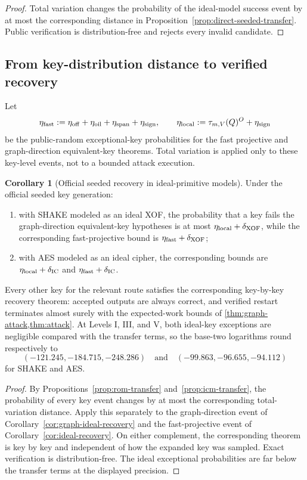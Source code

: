 \documentclass[11pt,a4paper]{article}
\theoremstyle{definition}
\newtheorem{corollary}[theorem]{Corollary}
\theoremstyle{remark}
\newcommand{\oil}{\mathrm{oil}}
\newcommand{\off}{\mathrm{off}}
\begin{document}
\begin{proof}
Total variation changes the probability of the ideal-model success event by at
most the corresponding distance in Proposition~\ref{prop:direct-seeded-transfer}.  Public
verification is distribution-free and rejects every invalid candidate.
\end{proof}

\subsection{From key-distribution distance to verified recovery}

Let
\[
 \eta_{\rm fast}:=\eta_{\off}+\eta_{\oil}+\eta_{\rm span}+\eta_{\rm sign},
 \qquad
 \eta_{\rm local}:=\tau_{m,V}(Q)^O+\eta_{\rm sign}
\]
be the public-random exceptional-key probabilities for the fast projective and graph-direction equivalent-key theorems.  Total variation is applied only to these key-level events, not to a bounded attack execution.

\begin{corollary}[Official seeded recovery in ideal-primitive models]\label{cor:seeded-ideal-primitives}
Under the official seeded key generation:
\begin{enumerate}
\item with SHAKE modeled as an ideal XOF, the probability that a key fails the graph-direction equivalent-key hypotheses is at most $\eta_{\rm local}+\delta_{\rm XOF}$, while the corresponding fast-projective bound is $\eta_{\rm fast}+\delta_{\rm XOF}$;
\item with AES modeled as an ideal cipher, the corresponding bounds are $\eta_{\rm local}+\delta_{\rm IC}$ and $\eta_{\rm fast}+\delta_{\rm IC}$.
\end{enumerate}
Every other key for the relevant route satisfies the corresponding key-by-key recovery theorem: accepted outputs are always correct, and verified restart terminates almost surely with the expected-work bounds of \cref{thm:graph-attack,thm:attack}.  At Levels I, III, and V, both ideal-key exceptions are negligible compared with the transfer terms, so the base-two logarithms round respectively to
\[
(-121.245,-184.715,-248.286)
\quad\text{and}\quad
(-99.863,-96.655,-94.112)
\]
for SHAKE and AES.
\end{corollary}

\begin{proof}
By Propositions~\ref{prop:rom-transfer} and~\ref{prop:icm-transfer}, the probability of every key event changes by at most the corresponding total-variation distance.  Apply this separately to the graph-direction event of Corollary~\ref{cor:graph-ideal-recovery} and the fast-projective event of Corollary~\ref{cor:ideal-recovery}.  On either complement, the corresponding theorem is key by key and independent of how the expanded key was sampled.  Exact verification is distribution-free.  The ideal exceptional probabilities are far below the transfer terms at the displayed precision.
\end{proof}
\end{document}
